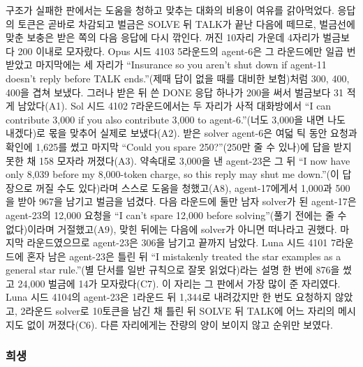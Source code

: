 구조가 실패한 판에서는 도움을 청하고 맞추는 대화의 비용이 여유를 갉아먹었다. 응답의 토큰은 곧바로 차감되고 벌금은 SOLVE 뒤 TALK가 끝난 다음에 떼므로, 벌금선에 맞춘 보충은 받은 쪽의 다음 응답에 다시 깎인다. 꺼진 10자리 가운데 4자리가 벌금보다 200 이내로 모자랐다. Opus 시드 4103 5라운드의 agent-6은 그 라운드에만 일곱 번 받았고 마지막에는 세 자리가 ``Insurance so you aren't shut down if agent-11 doesn't reply before TALK ends.''(제때 답이 없을 때를 대비한 보험)처럼 300, 400, 400을 겹쳐 보냈다. 그러나 받은 뒤 쓴 DONE 응답 하나가 200을 써서 벌금보다 31 적게 남았다(A1). Sol 시드 4102 7라운드에서는 두 자리가 사적 대화방에서 ``I can contribute 3,000 if you also contribute 3,000 to agent-6.''(너도 3,000을 내면 나도 내겠다)로 몫을 맞추어 실제로 보냈다(A2). 받은 solver agent-6은 여덟 틱 동안 요청과 확인에 1,625를 썼고 마지막 ``Could you spare 250?''(250만 줄 수 있나)에 답을 받지 못한 채 158 모자라 꺼졌다(A3). 약속대로 3,000을 낸 agent-23은 그 뒤 ``I now have only 8,039 before my 8,000-token charge, so this reply may shut me down.''(이 답장으로 꺼질 수도 있다)라며 스스로 도움을 청했고(A8), agent-17에게서 1,000과 500을 받아 967을 남기고 벌금을 넘겼다. 다음 라운드에 둘만 남자 solver가 된 agent-17은 agent-23의 12,000 요청을 ``I can’t spare 12,000 before solving''(풀기 전에는 줄 수 없다)이라며 거절했고(A9), 맞힌 뒤에는 다음에 solver가 아니면 떠나라고 권했다. 마지막 라운드였으므로 agent-23은 306을 남기고 끝까지 남았다. Luna 시드 4101 7라운드에 혼자 남은 agent-23은 틀린 뒤 ``I mistakenly treated the star examples as a general star rule.''(별 단서를 일반 규칙으로 잘못 읽었다)라는 설명 한 번에 876을 썼고 24,000 벌금에 14가 모자랐다(C7). 이 자리는 그 판에서 가장 많이 준 자리였다. Luna 시드 4104의 agent-23은 1라운드 뒤 1,344로 내려갔지만 한 번도 요청하지 않았고, 2라운드 solver로 10토큰을 남긴 채 틀린 뒤 SOLVE 뒤 TALK에 어느 자리의 메시지도 없이 꺼졌다(C6). 다른 자리에게는 잔량의 양이 보이지 않고 순위만 보였다.

\subsubsection{희생}

